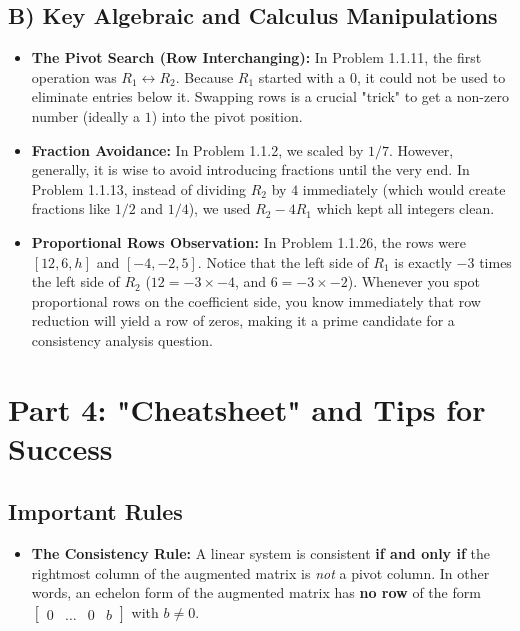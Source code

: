 \documentclass[11pt]{article}
\begin{document}
\subsection{B) Key Algebraic and Calculus Manipulations}
\begin{itemize}
    \item \textbf{The Pivot Search (Row Interchanging):} In Problem 1.1.11, the first operation was $R_1 \leftrightarrow R_2$. Because $R_1$ started with a $0$, it could not be used to eliminate entries below it. Swapping rows is a crucial "trick" to get a non-zero number (ideally a $1$) into the pivot position.
    \item \textbf{Fraction Avoidance:} In Problem 1.1.2, we scaled by $1/7$. However, generally, it is wise to avoid introducing fractions until the very end. In Problem 1.1.13, instead of dividing $R_2$ by $4$ immediately (which would create fractions like $1/2$ and $1/4$), we used $R_2 - 4R_1$ which kept all integers clean.
    \item \textbf{Proportional Rows Observation:} In Problem 1.1.26, the rows were $[12, 6, h]$ and $[-4, -2, 5]$. Notice that the left side of $R_1$ is exactly $-3$ times the left side of $R_2$ ($12 = -3 \times -4$, and $6 = -3 \times -2$). Whenever you spot proportional rows on the coefficient side, you know immediately that row reduction will yield a row of zeros, making it a prime candidate for a consistency analysis question.
\end{itemize}

\newpage
\section{Part 4: "Cheatsheet" and Tips for Success}

\subsection{Important Rules}
\begin{itemize}
    \item \textbf{The Consistency Rule:} A linear system is consistent \textbf{if and only if} the rightmost column of the augmented matrix is \textit{not} a pivot column. In other words, an echelon form of the augmented matrix has \textbf{no row} of the form $\begin{bmatrix} 0 & \dots & 0 & b \end{bmatrix}$ with $b \neq 0$.
\end{itemize}
\end{document}
